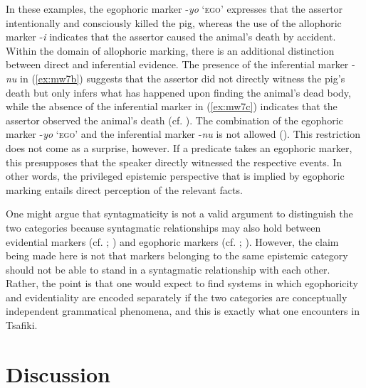 \documentclass[output=paper]{langsci/langscibook}
\begin{document}
In these examples, the egophoric marker -\textit{yo} ‘\textsc{ego}’ expresses that the assertor intentionally and consciously killed the pig, whereas the use of the allophoric marker -\textit{i} indicates that the assertor caused the animal’s death by accident. Within the domain of allophoric marking, there is an additional distinction between direct and inferential evidence. The presence of the inferential marker -\textit{nu} in (\ref{ex:mw7b}) suggests that the assertor did not directly witness the pig’s death but only infers what has happened upon finding the animal’s dead body, while the absence of the inferential marker in (\ref{ex:mw7c}) indicates that the assertor observed the animal’s death (cf. \citealt[412]{Dickinson2000}). The combination of the egophoric marker -\textit{yo} ‘\textsc{ego}’ and the inferential marker -\textit{nu} is not allowed (\citealt[410--413]{Dickinson2000}). This restriction does not come as a surprise, however. If a predicate takes an egophoric marker, this presupposes that the speaker directly witnessed the respective events. In other words, the privileged epistemic perspective that is implied by egophoric marking entails direct perception of the relevant facts.

One might argue that syntagmaticity is not a valid argument to distinguish the two categories because syntagmatic relationships may also hold between evidential markers (cf. \citealt{Aikhenvald2004}; \citealt{Hengeveld2015}) and egophoric markers (cf. \citealt{Widmer2017a}; \citealt{Floyd2018}). However, the claim being made here is not that markers belonging to the same epistemic category should not be able to stand in a syntagmatic relationship with each other. Rather, the point is that one would expect to find systems in which egophoricity and evidentiality are encoded separately if the two categories are conceptually independent grammatical phenomena, and this is exactly what one encounters in Tsafiki.

\section{Discussion}\label{s:mw5}
\end{document}
